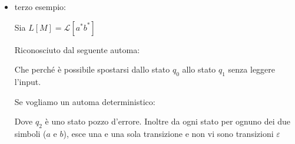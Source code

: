 {\begin{itemize}
        Si noti che $ba\in L[M]$ (ovvero $ba$ appartiene al linguaggio riconosciuto dall'automa $M$)  perché esiste un cammino da $q_0$ a $q_2$ etichettato $ba$

        Questo linguaggio è :
        \begin{itemize}
            \item $(q_0, b)$ offre 2 mosse o su $q_0$ o su $q_1$
            \item $(q_1, b)$ non offre mosse
            \item $(q_2, a/b)$ non offre mosse 
        \end{itemize}

        \item terzo esempio:
        
        Sia $L[M]=\mathcal{L}[a^*b^*]$

        Riconosciuto dal seguente automa:
        \begin{center}
        \end{center}

        Che  perché è possibile spostarsi dallo stato $q_0$ allo stato $q_1$ senza leggere l'input. 
        
        Se vogliamo un automa deterministico:
        \begin{center}
        \end{center}   
        Dove $q_2$ è uno stato pozzo d'errore. Inoltre da ogni stato per ognuno dei due simboli ($a$ e $b$), esce una e una sola transizione e non vi sono transizioni $\varepsilon$

        
    \end{itemize}
}
